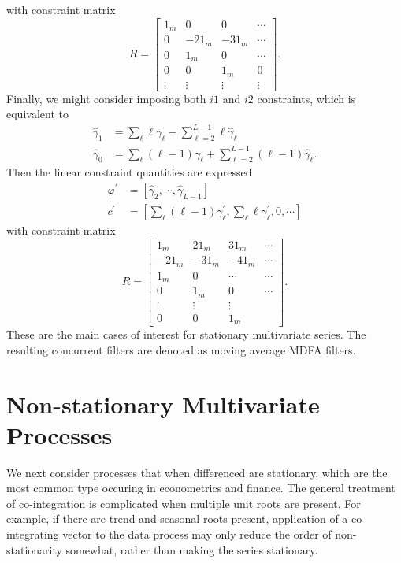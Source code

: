 \documentclass[a4paper]{book}
\begin{document}
 with constraint matrix 
\[
 R  = \left[ \begin{array}{llll} 1_m & 0 & 0 & \cdots \\ 0 & -2 1_m & -3 1_m & \cdots \\ 0 & 1_m & 0 & \cdots \\
  0 & 0 & 1_m & 0 \\
  \vdots & \vdots & \vdots & \vdots  \end{array} \right].
\]
 Finally, we might consider imposing both $i1$ and $i2$ constraints, which is equivalent to
\begin{align*}
  \widehat{\gamma}_1 & = \sum_{\ell} \ell \gamma_{\ell} - \sum_{\ell=2}^{L-1} \ell \widehat{\gamma}_{\ell} \\
 \widehat{\gamma}_0 & = \sum_{\ell}  (\ell - 1) \gamma_{\ell} + \sum_{\ell=2}^{L-1} (\ell -1)  \widehat{\gamma}_{\ell}.
\end{align*} 
  Then the linear constraint quantities are expressed
\begin{align*}
 \varphi^{\prime} & = [  \widehat{\gamma}_2, \cdots, \widehat{\gamma}_{L-1} ] \\
 c^{\prime} & = [ \sum_{\ell} (\ell-1)  \gamma_{\ell}^{\prime},  \sum_{\ell} \ell \gamma_{\ell}^{\prime}, 0, \cdots ] 
\end{align*}
 with constraint matrix 
\[
 R  = \left[ \begin{array}{llll} 1_m & 2 1_m  & 3 1_m & \cdots  \\ -2 1_m & -3 1_m & -4 1_m & \cdots \\
  1_m & 0 & \cdots & \cdots \\  0 & 1_m & 0& \cdots \\
\vdots & \vdots & \vdots \\ 0 & 0 & 1_m \end{array} \right].
\]
  These are the main cases of interest for stationary multivariate series.  The resulting concurrent filters are denoted as moving average MDFA filters.


\section{Non-stationary Multivariate Processes}


We next consider processes that when differenced are 
stationary, which are the most common type occuring in econometrics and finance.   The general treatment of co-integration is complicated when
 multiple unit roots are present.  For example, if there are trend
 and seasonal roots present, application of a co-integrating vector
 to the data process may only reduce the order of non-stationarity
 somewhat, rather than making the series stationary. 
\end{document}
